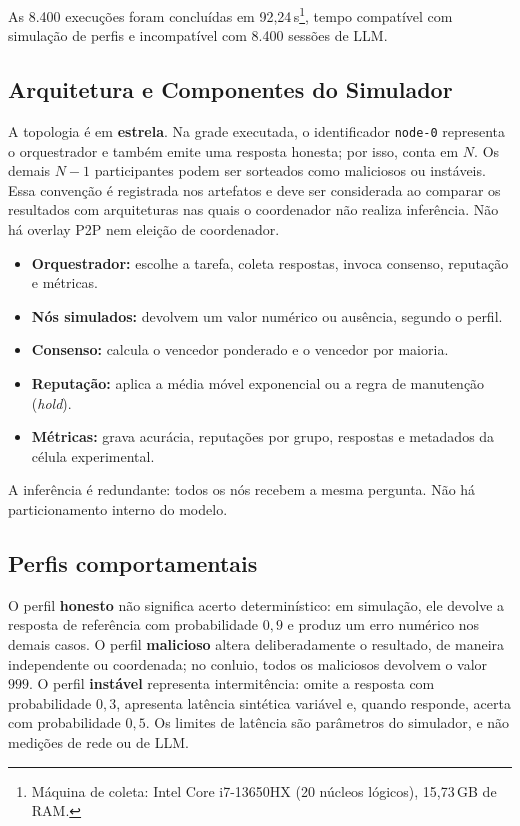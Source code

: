 \documentclass[12pt]{article}
\begin{document}
As 8.400 execuções foram concluídas em 92{,}24\,s\footnote{Máquina de coleta: Intel Core i7-13650HX (20 núcleos lógicos), 15{,}73\,GB de RAM.}, tempo compatível com simulação de perfis e incompatível com 8.400 sessões de LLM.

\subsection{Arquitetura e Componentes do Simulador}

A topologia é em \textbf{estrela}. Na grade executada, o identificador \texttt{node-0} representa o orquestrador e também emite uma resposta honesta; por isso, conta em $N$. Os demais $N-1$ participantes podem ser sorteados como maliciosos ou instáveis. Essa convenção é registrada nos artefatos e deve ser considerada ao comparar os resultados com arquiteturas nas quais o coordenador não realiza inferência. Não há overlay P2P nem eleição de coordenador.

\begin{itemize}[nosep]
    \item \textbf{Orquestrador:} escolhe a tarefa, coleta respostas, invoca consenso, reputação e métricas.
    \item \textbf{Nós simulados:} devolvem um valor numérico ou ausência, segundo o perfil.
    \item \textbf{Consenso:} calcula o vencedor ponderado e o vencedor por maioria.
    \item \textbf{Reputação:} aplica a média móvel exponencial ou a regra de manutenção (\textit{hold}).
    \item \textbf{Métricas:} grava acurácia, reputações por grupo, respostas e metadados da célula experimental.
\end{itemize}

A inferência é redundante: todos os nós recebem a mesma pergunta. Não há particionamento interno do modelo.

\subsection{Perfis comportamentais}

O perfil \textbf{honesto} não significa acerto determinístico: em simulação, ele devolve a resposta de referência com probabilidade $0{,}9$ e produz um erro numérico nos demais casos. O perfil \textbf{malicioso} altera deliberadamente o resultado, de maneira independente ou coordenada; no conluio, todos os maliciosos devolvem o valor $999$. O perfil \textbf{instável} representa intermitência: omite a resposta com probabilidade $0{,}3$, apresenta latência sintética variável e, quando responde, acerta com probabilidade $0{,}5$. Os limites de latência são parâmetros do simulador, e não medições de rede ou de LLM.
\end{document}
